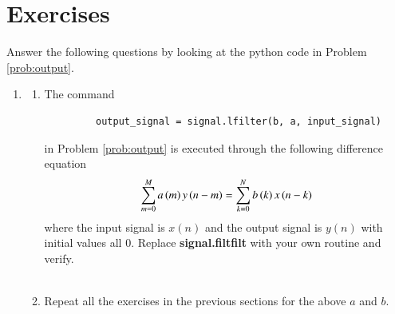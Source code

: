 \documentclass[journal,12pt,twocolumn]{IEEEtran}
\renewcommand\thesection{\arabic{section}}
\begin{document}
 \section{Exercises}
 Answer the following questions by looking at the python code in Problem \ref{prob:output}.
 \begin{enumerate}[label=\thesection.\arabic*]
 \item
 \begin{enumerate}[label=\thesection.\arabic*]
	 \item
	 The command
	 \begin{lstlisting}
		 output_signal = signal.lfilter(b, a, input_signal)
		 \end{lstlisting}
	 in Problem \ref{prob:output} is executed through the following difference equation
	 \begin{equation}
	 \label{eq:iir_filter_gen}
	  \sum _{m=0}^{M}a\left(m\right)y\left(n-m\right)=\sum _{k=0}^{N}b\left(k\right)x\left(n-k\right)
	 \end{equation}
	 where the input signal is $x(n)$ and the output signal is $y(n)$ with initial values all 0. Replace
	 \textbf{signal.filtfilt} with your own routine and verify.
	 \\\solution\\
	 
	 \item Repeat all the exercises in the previous sections for the above $a$ and $b$.
	 \\
	 \solution

\end{enumerate}
\end{enumerate}
\end{document}
